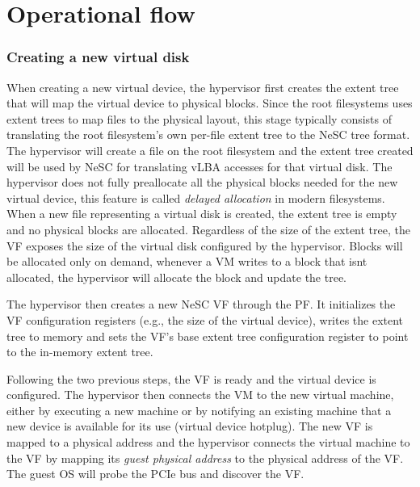 \section{Operational flow}

\subsubsection{Creating a new virtual disk}
When creating a new virtual device, the hypervisor first creates the extent tree that will map the virtual device to physical blocks. Since the root  filesystems uses extent trees to map files to the physical layout, this stage typically consists of translating the root filesystem's own per-file extent tree to the NeSC tree format. The hypervisor will create a file on the root filesystem and the extent tree created will be used by NeSC for translating vLBA accesses for that virtual disk.
%
The hypervisor does not fully preallocate all the physical blocks needed for the new virtual device, this feature is called \emph{delayed allocation} in modern filesystems. When a new file representing a virtual disk is created, the
extent tree is empty and no physical blocks are allocated. Regardless of the size of the extent tree, the VF exposes the size of the virtual disk configured by the hypervisor. Blocks will be allocated only on demand, whenever a VM writes to
a block that isnt allocated, the hypervisor will allocate the block and update the tree.

The hypervisor then creates a new NeSC VF through the PF. It initializes the VF configuration registers (e.g., the size of the virtual device), writes the extent tree to  memory and sets the VF's base extent tree configuration register to point to the in-memory extent tree.

Following the two previous steps, the VF is ready and the virtual device is configured. The hypervisor then connects the VM to the new virtual machine, either by executing a new machine or by notifying an existing machine that a new device is available for its use (virtual device hotplug).
The new VF is mapped to a physical address and the hypervisor connects the virtual machine to the VF by mapping its \emph{guest physical address} to the physical address of the VF.
The guest OS will probe the PCIe bus and discover the VF.


